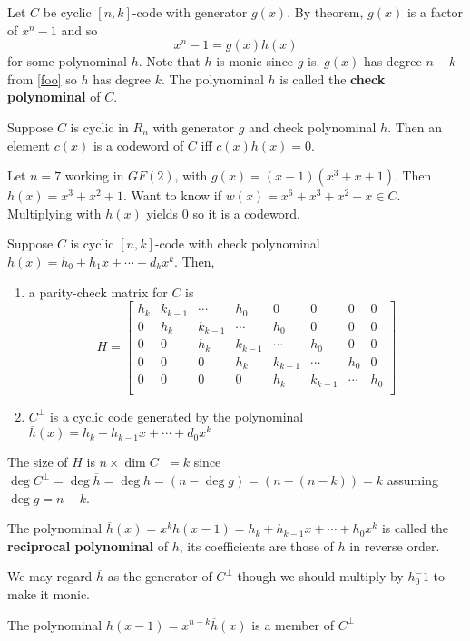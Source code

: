 \documentclass{article}
\begin{document}
\begin{definition}
  Let \( C \) be cyclic \( [n, k] \)-code with generator \( g(x) \).
  By theorem, \( g(x) \) is a factor of \( x^n-1 \) and so \[
    x^n-1= g(x)h(x)
  \] for some polynominal \( h \). Note that \( h  \) is monic since
  \( g  \) is. \( g(x) \) has degree \( n-k  \) from \autoref{foo} so
  \( h  \) has degree \( k \). The polynominal \( h  \) is called the
  \textbf{check polynominal} of \( C \).
\end{definition}
\begin{theorem}
  Suppose \( C \) is cyclic in \( R_n  \) with generator \( g  \) and
  check polynominal \( h \). Then an element \( c(x)  \) is a
  codeword of \( C \) iff \( c(x)h(x) = 0 \).
\end{theorem}
\begin{example}
  Let \( n = 7 \) working in \( GF(2) \), with \( g(x) =  (x-1)(x^3+x+1)\). Then \( h(x) = x^3+x^2+1 \). Want to know if \( w(x) = x^6+x^3+x^2+x \in C \). Multiplying with \( h(x) \) yields \( 0 \) so it is a codeword. 
\end{example}
\begin{theorem}
  Suppose \( C  \) is cyclic \( [n, k] \)-code with check polynominal
  \( h(x) = h_0 + h_1x + \cdots + d_kx^k \). Then,
  \begin{enumerate}
    \item a parity-check matrix for \( C  \) is \[
        H =
        \begin{bmatrix}
          h_k & k_{k-1} & \cdots  & h_0 & 0 & 0 & 0 & 0\\
          0 & h_k  & k_{k-1} & \cdots  & h_0 & 0 & 0 & 0\\
          0 & 0 & h_k  & k_{k-1} & \cdots  & h_0 & 0 & 0\\
          0 & 0 & 0 & h_k  & k_{k-1} & \cdots  & h_0 & 0\\
          0 & 0 & 0 & 0 & h_k  & k_{k-1} & \cdots  & h_0\\
        \end{bmatrix}
      \]
    \item \( C^\perp \) is a cyclic code generated by the polynominal \(
      \overline{h}(x) = h_k + h_{k-1}x + \cdots + d_0x^k   \)
  \end{enumerate}

  The size of \( H \) is \( n \times \dim C^\perp = k\) since \( \deg C^\perp = \deg \overline{h} = \deg h = (n -\deg g) = (n - (n - k)) = k\) assuming \( \deg g = n - k \).
\end{theorem}
\begin{definition}
  The polynominal \( \overline{h}(x) = x^kh(x-1) = h_k + h_{k-1}x + \cdots + h_0x^k    \) is called the \textbf{reciprocal polynominal} of \( h \), its coefficients are those of \( h   \) in reverse order.

  We may regard \( \overline{h}  \) as the generator of \( C^\perp  \) though we should multiply by \( h_0^-1 \) to make it monic.
\end{definition}
\begin{remark}
  The polynominal \( h(x-1) =x^{n-k}\overline{h}(x) \) is a member of \( C^\perp  \)
\end{remark}
\end{document}
